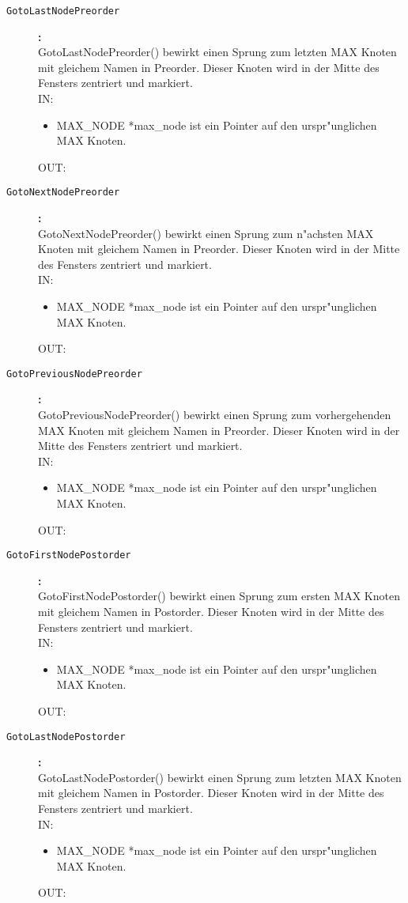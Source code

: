 \begin{description}
\item[\tt GotoLastNodePreorder]{\bf :\\}
GotoLastNodePreorder() bewirkt einen Sprung zum letzten MAX Knoten mit gleichem Namen in Preorder. Dieser Knoten wird in der Mitte des Fensters zentriert und markiert. \\
IN:
\begin{itemize}
   \item MAX\_NODE *max\_node ist ein Pointer auf den urspr"unglichen MAX Knoten.
\end{itemize}
OUT:

\item[\tt GotoNextNodePreorder]{\bf :\\}
GotoNextNodePreorder() bewirkt einen Sprung zum n"achsten MAX Knoten mit gleichem Namen in Preorder. Dieser Knoten wird in der Mitte des Fensters zentriert und markiert. \\
IN:
\begin{itemize}
   \item MAX\_NODE *max\_node ist ein Pointer auf den urspr"unglichen MAX Knoten.
\end{itemize}
OUT:

\item[\tt GotoPreviousNodePreorder]{\bf :\\}
GotoPreviousNodePreorder() bewirkt einen Sprung zum vorhergehenden MAX Knoten mit gleichem Namen in Preorder. Dieser Knoten wird in der Mitte des Fensters zentriert und markiert. \\
IN:
\begin{itemize}
   \item MAX\_NODE *max\_node ist ein Pointer auf den urspr"unglichen MAX Knoten.
\end{itemize}
OUT:

\item[\tt GotoFirstNodePostorder]{\bf :\\}
GotoFirstNodePostorder() bewirkt einen Sprung zum ersten MAX Knoten mit gleichem Namen in Postorder. Dieser Knoten wird in der Mitte des Fensters zentriert und markiert. \\
IN:
\begin{itemize}
   \item MAX\_NODE *max\_node ist ein Pointer auf den urspr"unglichen MAX Knoten.
\end{itemize}
OUT:

\item[\tt GotoLastNodePostorder]{\bf :\\}
GotoLastNodePostorder() bewirkt einen Sprung zum letzten MAX Knoten mit gleichem Namen in Postorder. Dieser Knoten wird in der Mitte des Fensters zentriert und markiert. \\
IN:
\begin{itemize}
   \item MAX\_NODE *max\_node ist ein Pointer auf den urspr"unglichen MAX Knoten.
\end{itemize}
OUT:


\end{description}
